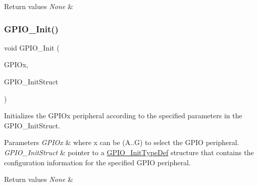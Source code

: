 \begin{DoxyRetVals}{Return values}
{\em None} & \\
\hline
\end{DoxyRetVals}
\mbox{\label{group___g_p_i_o___exported___functions_ga71abf9404261370d03cca449b88d3a65}} 
\subsubsection{\texorpdfstring{GPIO\_Init()}{GPIO\_Init()}}
{\footnotesize\ttfamily void G\+P\+I\+O\+\_\+\+Init (\begin{DoxyParamCaption}\item[{\mbox{\hyperlink{struct_g_p_i_o___type_def}{G\+P\+I\+O\+\_\+\+Type\+Def}} $\ast$}]{G\+P\+I\+Ox,  }\item[{\mbox{\hyperlink{struct_g_p_i_o___init_type_def}{G\+P\+I\+O\+\_\+\+Init\+Type\+Def}} $\ast$}]{G\+P\+I\+O\+\_\+\+Init\+Struct }\end{DoxyParamCaption})}



Initializes the G\+P\+I\+Ox peripheral according to the specified parameters in the G\+P\+I\+O\+\_\+\+Init\+Struct. 


\begin{DoxyParams}{Parameters}
{\em G\+P\+I\+Ox} & where x can be (A..G) to select the G\+P\+IO peripheral. \\
\hline
{\em G\+P\+I\+O\+\_\+\+Init\+Struct} & pointer to a \mbox{\hyperlink{struct_g_p_i_o___init_type_def}{G\+P\+I\+O\+\_\+\+Init\+Type\+Def}} structure that contains the configuration information for the specified G\+P\+IO peripheral. \\
\hline
\end{DoxyParams}

\begin{DoxyRetVals}{Return values}
{\em None} & \\
\hline
\end{DoxyRetVals}
\mbox{\label{group___g_p_i_o___exported___functions_gad2f2e615928c69fd0d8c641a7cedaafc}} 
